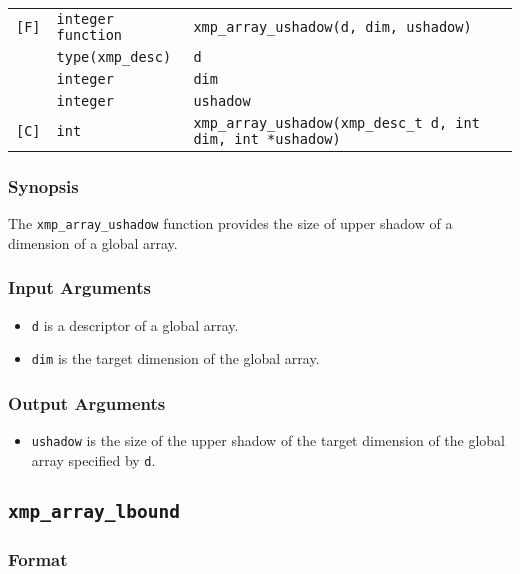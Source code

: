 \begin{tabular}{lll}

\verb![F]!& {\tt integer function}& {\tt xmp\_array\_ushadow(d, dim, ushadow)}\\
          & {\tt type(xmp\_desc)} & {\tt d}\\
          & {\tt integer} & {\tt dim}\\
          & {\tt integer} & {\tt ushadow}\\

\verb![C]!&  {\tt int}& {\tt xmp\_array\_ushadow(xmp\_desc\_t d, int dim, int *ushadow)}\\

\end{tabular}

\subsubsection*{Synopsis}

The {\tt xmp\_array\_ushadow} function provides the size of upper shadow
of a dimension of a global array.


\subsubsection*{Input Arguments}
\begin{itemize}
 \item {\tt d} is a descriptor of a global array.
 \item {\tt dim} is the target dimension of the global array.
\end{itemize}

\subsubsection*{Output Arguments}
\begin{itemize}
 \item {\tt ushadow} is the size of the upper shadow of the target
       dimension of the global array specified by {\tt d}.
\end{itemize}


\subsection{\tt xmp\_array\_lbound}

\subsubsection*{Format}

